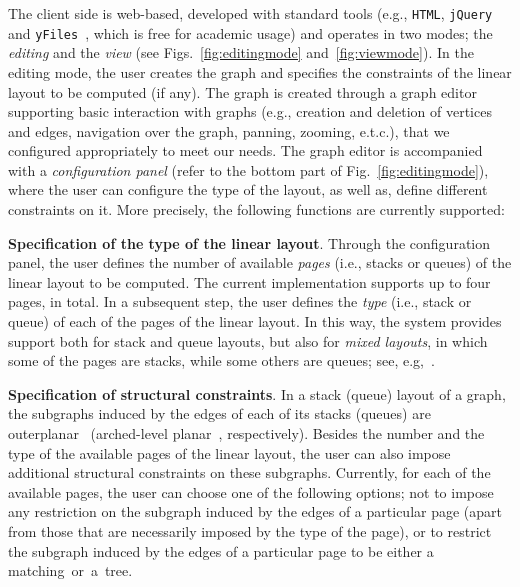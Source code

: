 \documentclass[runningheads]{llncs}
\newcommand{\myparagraph}[1]{\medskip\noindent\textbf{#1}.}
\begin{document}
The client side is web-based, developed with standard tools (e.g., \texttt{HTML}, \texttt{jQuery} and \texttt{yFiles}~\cite{DBLP:conf/gd/WieseEK00}, which is free for academic usage) and operates in two modes; the \emph{editing} and the \emph{view} (see Figs.~\ref{fig:editingmode} and~\ref{fig:viewmode}).  In the editing mode, the user creates the graph and specifies the constraints of the linear layout to be computed (if any). The graph is created through a graph editor supporting basic interaction with graphs (e.g., creation and deletion of vertices and edges, navigation over the graph, panning, zooming, e.t.c.), that we configured appropriately to meet our needs. The graph editor is accompanied with a \emph{configuration panel} 
(refer to the bottom part of Fig.~\ref{fig:editingmode}), where the user can configure the type of the layout, as well as, define different constraints on it. More precisely, the following functions are currently supported:

\myparagraph{Specification of the type of the linear layout} Through the configuration panel, the user defines the number of available \emph{pages} (i.e., stacks or queues) of the linear layout to be computed. The current implementation supports up to four pages, in total. In a subsequent step, the user defines the \emph{type} (i.e., stack or queue) of each of the pages of the linear layout. In this way, the system provides support both for stack and queue layouts, but also for \textit{mixed layouts}, in which some of the pages are stacks, while some others are queues; see, e.g,~\cite{DBLP:conf/gd/Pupyrev17}.

\myparagraph{Specification of structural constraints} In a stack (queue) layout of a graph, the subgraphs induced by the edges of each of its stacks (queues) are outerplanar~\cite{DBLP:journals/jct/BernhartK79} (arched-level planar~\cite{DBLP:journals/siamcomp/HeathR92}, respectively). 
%
Besides the number and the type of the available pages of the linear layout, the user can also impose additional structural constraints on these subgraphs. Currently, for each of the available pages, the user can choose one of the following options; not to impose any restriction on the subgraph induced by the edges of a particular page (apart from those that are necessarily imposed by the type of the page), or to restrict the subgraph induced by the edges of a particular page to be either a matching~or~a~tree.
\end{document}
